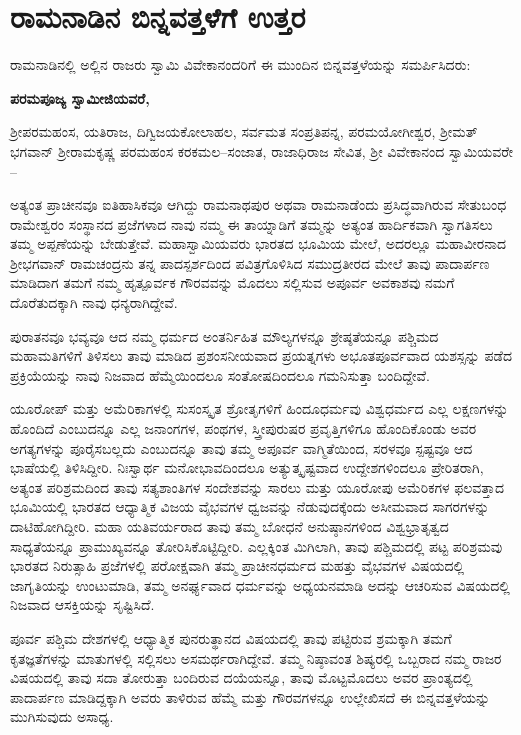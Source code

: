 
\chapter{ರಾಮನಾಡಿನ ಬಿನ್ನವತ್ತಳೆಗೆ ಉತ್ತರ}

ರಾಮನಾಡಿನಲ್ಲಿ ಅಲ್ಲಿನ ರಾಜರು ಸ್ವಾಮಿ ವಿವೇಕಾನಂದರಿಗೆ ಈ ಮುಂದಿನ ಬಿನ್ನವತ್ತಳೆ\break ಯನ್ನು ಸಮರ್ಪಿಸಿದರು:

\vskip 2pt

\textbf{ಪರಮಪೂಜ್ಯ ಸ್ವಾಮೀಜಿಯವರೆ,}

ಶ‍್ರೀಪರಮಹಂಸ, ಯತಿರಾಜ, ದಿಗ್ವಿಜಯಕೋಲಾಹಲ, ಸರ್ವಮತ ಸಂಪ್ರತಿಪನ್ನ, ಪರಮಯೋಗೀಶ್ವರ, ಶ‍್ರೀಮತ್​ ಭಗವಾನ್​ ಶ‍್ರೀರಾಮಕೃಷ್ಣ ಪರಮಹಂಸ ಕರಕಮಲ–ಸಂಜಾತ, ರಾಜಾಧಿರಾಜ ಸೇವಿತ, ಶ‍್ರೀ ವಿವೇಕಾನಂದ ಸ್ವಾಮಿಯವರೇ –

\vskip 2pt

ಅತ್ಯಂತ ಪ್ರಾಚೀನವೂ ಐತಿಹಾಸಿಕವೂ ಆಗಿದ್ದು ರಾಮನಾಥಪುರ ಅಥವಾ ರಾಮನಾಡೆಂದು ಪ್ರಸಿದ್ಧವಾಗಿರುವ ಸೇತುಬಂಧ ರಾಮೇಶ್ವರಂ ಸಂಸ್ಥಾನದ ಪ್ರಜೆಗಳಾದ ನಾವು ನಮ್ಮ ಈ ತಾಯ್ನಾಡಿಗೆ ತಮ್ಮನ್ನು ಅತ್ಯಂತ ಹಾರ್ದಿಕವಾಗಿ ಸ್ವಾಗತಿಸಲು ತಮ್ಮ ಅಪ್ಪಣೆಯನ್ನು ಬೇಡುತ್ತೇವೆ. ಮಹಾಸ್ವಾಮಿಯವರು ಭಾರತದ ಭೂಮಿಯ ಮೇಲೆ, ಅದರಲ್ಲೂ ಮಹಾವೀರನಾದ ಶ‍್ರೀಭಗವಾನ್​ ರಾಮಚಂದ್ರನು ತನ್ನ ಪಾದಸ್ಪರ್ಶದಿಂದ ಪವಿತ್ರಗೊಳಿಸಿದ ಸಮುದ್ರತೀರದ ಮೇಲೆ ತಾವು ಪಾದಾರ್ಪಣ ಮಾಡಿದಾಗ ತಮಗೆ ನಮ್ಮ ಹೃತ್ಪೂರ್ವಕ ಗೌರವವನ್ನು ಮೊದಲು ಸಲ್ಲಿಸುವ ಅಪೂರ್ವ ಅವಕಾಶವು ನಮಗೆ ದೊರೆತುದಕ್ಕಾಗಿ ನಾವು ಧನ್ಯರಾಗಿದ್ದೇವೆ.

\vskip 2pt

ಪುರಾತನವೂ ಭವ್ಯವೂ ಆದ ನಮ್ಮ ಧರ್ಮದ ಅಂತರ್ನಿಹಿತ ಮೌಲ್ಯಗಳನ್ನೂ ಶ್ರೇಷ್ಠತೆಯನ್ನೂ ಪಶ್ಚಿಮದ ಮಹಾಮತಿಗಳಿಗೆ ತಿಳಿಸಲು ತಾವು ಮಾಡಿದ ಪ್ರಶಂಸನೀಯವಾದ ಪ್ರಯತ್ನಗಳು ಅಭೂತಪೂರ್ವವಾದ ಯಶಸ್ಸನ್ನು ಪಡೆದ ಪ್ರಕ್ರಿಯೆಯನ್ನು ನಾವು ನಿಜವಾದ ಹೆಮ್ಮೆಯಿಂದಲೂ ಸಂತೋಷದಿಂದಲೂ ಗಮನಿಸುತ್ತಾ ಬಂದಿದ್ದೇವೆ.

\vskip 2pt

ಯೂರೋಪ್​ ಮತ್ತು ಅಮೆರಿಕಾಗಳಲ್ಲಿ ಸುಸಂಸ್ಕೃತ ಶ್ರೋತೃಗಳಿಗೆ ಹಿಂದೂಧರ್ಮವು ವಿಶ್ವಧರ್ಮದ ಎಲ್ಲ ಲಕ್ಷಣಗಳನ್ನು ಹೊಂದಿದೆ ಎಂಬುದನ್ನೂ ಎಲ್ಲ ಜನಾಂಗಗಳ, ಪಂಥಗಳ, ಸ್ತ್ರೀಪುರುಷರ ಪ್ರವೃತ್ತಿಗಳಿಗೂ ಹೊಂದಿಕೊಂಡು ಅವರ ಅಗತ್ಯಗಳನ್ನು ಪೂರೈಸಬಲ್ಲದು ಎಂಬುದನ್ನೂ ತಾವು ತಮ್ಮ ಅಪೂರ್ವ ವಾಗ್ಮಿತೆಯಿಂದ, ಸರಳವೂ ಸ್ಪಷ್ಟವೂ ಆದ ಭಾಷೆಯಲ್ಲಿ ತಿಳಿಸಿದ್ದೀರಿ. ನಿಃಸ್ವಾರ್ಥ ಮನೋಭಾವದಿಂದಲೂ ಅತ್ಯುತ್ಕೃಷ್ಟವಾದ ಉದ್ದೇಶಗಳಿಂದಲೂ ಪ್ರೇರಿತರಾಗಿ, ಅತ್ಯಂತ ಪರಿಶ್ರಮದಿಂದ ತಾವು ಸತ್ಯಶಾಂತಿಗಳ ಸಂದೇಶವನ್ನು ಸಾರಲು ಮತ್ತು ಯೂರೋಪು ಅಮೆರಿಕಗಳ ಫಲವತ್ತಾದ ಭೂಮಿಯಲ್ಲಿ ಭಾರತದ ಆಧ್ಯಾತ್ಮಿಕ ವಿಜಯ ವೈಭವಗಳ ಧ್ವಜವನ್ನು ನೆಡುವುದಕ್ಕೆಂದು ಅಸೀಮವಾದ ಸಾಗರಗಳನ್ನು ದಾಟಿಹೋಗಿದ್ದೀರಿ. ಮಹಾ ಯತಿವರ್ಯರಾದ ತಾವು ತಮ್ಮ ಬೋಧನೆ ಅನುಷ್ಠಾನಗಳಿಂದ ವಿಶ್ವಭ್ರಾತೃತ್ವದ ಸಾಧ್ಯತೆಯನ್ನೂ ಪ್ರಾಮುಖ್ಯವನ್ನೂ ತೋರಿಸಿಕೊಟ್ಟಿದ್ದೀರಿ. ಎಲ್ಲಕ್ಕಿಂತ ಮಿಗಿಲಾಗಿ, ತಾವು ಪಶ್ಚಿಮದಲ್ಲಿ ಪಟ್ಟ ಪರಿಶ್ರಮವು ಭಾರತದ ನಿರುತ್ಸಾಹಿ ಪ್ರಜೆಗಳಲ್ಲಿ ಪರೋಕ್ಷವಾಗಿ ತಮ್ಮ ಪ್ರಾಚೀನಧರ್ಮದ ಮಹತ್ತು ವೈಭವಗಳ ವಿಷಯದಲ್ಲಿ ಜಾಗೃತಿಯನ್ನು ಉಂಟುಮಾಡಿ, ತಮ್ಮ ಅನರ್ಘ್ಯವಾದ ಧರ್ಮವನ್ನು ಅಧ್ಯಯನಮಾಡಿ ಅದನ್ನು ಆಚರಿಸುವ ವಿಷಯದಲ್ಲಿ ನಿಜವಾದ ಆಸಕ್ತಿಯನ್ನು ಸೃಷ್ಟಿಸಿದೆ.

ಪೂರ್ವ ಪಶ್ಚಿಮ ದೇಶಗಳಲ್ಲಿ ಆಧ್ಯಾತ್ಮಿಕ ಪುನರುತ್ಥಾನದ ವಿಷಯದಲ್ಲಿ ತಾವು ಪಟ್ಟಿರುವ ಶ್ರಮಕ್ಕಾಗಿ ತಮಗೆ ಕೃತಜ್ಞತೆಗಳನ್ನು ಮಾತುಗಳಲ್ಲಿ ಸಲ್ಲಿಸಲು ಅಸಮರ್ಥರಾಗಿದ್ದೇವೆ. ತಮ್ಮ ನಿಷ್ಠಾವಂತ ಶಿಷ್ಯರಲ್ಲಿ ಒಬ್ಬರಾದ ನಮ್ಮ ರಾಜರ ವಿಷಯದಲ್ಲಿ ತಾವು ಸದಾ ತೋರುತ್ತಾ ಬಂದಿರುವ ದಯೆಯನ್ನೂ, ತಾವು ಮೊಟ್ಟಮೊದಲು ಅವರ ಪ್ರಾಂತ್ಯದಲ್ಲಿ ಪಾದಾರ್ಪಣ ಮಾಡಿದ್ದಕ್ಕಾಗಿ ಅವರು ತಾಳಿರುವ ಹೆಮ್ಮೆ ಮತ್ತು ಗೌರವಗಳನ್ನೂ ಉಲ್ಲೇಖಿಸದೆ ಈ ಬಿನ್ನವತ್ತಳೆಯನ್ನು ಮುಗಿಸುವುದು ಅಸಾಧ್ಯ.

